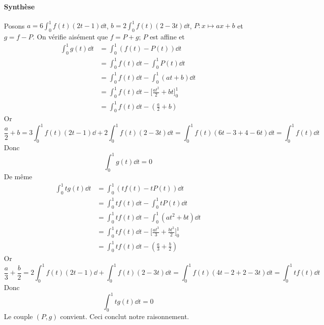 \documentclass[10pt]{article}
\begin{document}
    \paragraph{Synthèse} Posons $a=6\int_0^1f(t)(2t-1)\dd t$, $b=2\int_0^1f(t)(2-3t)\dd t$, $P:x\mapsto ax+b$ et $g=f-P$. On vérifie aisément que $f=P+g$; $P$ est affine et
    \begin{align*}
        \int_0^1g(t)\dd t &= \int_0^1(f(t)-P(t))\dd t\\
                          &= \int_0^1f(t)\dd t - \int_0^1P(t)\dd t\\
                          &= \int_0^1f(t)\dd t - \int_0^1(at+b)\dd t\\
                          &= \int_0^1f(t)\dd t - \Big[\frac {at^2}2+bt\Big]_0^1\\
                          &= \int_0^1f(t)\dd t - \left(\frac a2 +b\right)
    \end{align*}
    Or \[\frac a2 +b=3\int_0^1f(t)(2t-1)\dd+2\int_0^1f(t)(2-3t)\dd t=\int_0^1f(t)(6t-3+4-6t)\dd t=\int_0^1f(t)\dd t\]
    Donc \[\int_0^1g(t)\dd t=0\]
    De même 
    \begin{align*}
        \int_0^1tg(t)\dd t &= \int_0^1(tf(t)-tP(t))\dd t\\
                          &= \int_0^1tf(t)\dd t - \int_0^1tP(t)\dd t\\
                          &= \int_0^1tf(t)\dd t - \int_0^1(at^2+bt)\dd t\\
                          &= \int_0^1tf(t)\dd t - \Big[\frac {at^3}3+\frac{bt^2}2\Big]_0^1\\
                          &= \int_0^1tf(t)\dd t - \left(\frac a3 +\frac b2\right)
    \end{align*}
    Or \[\frac a3 +\frac b2=2\int_0^1f(t)(2t-1)\dd+\int_0^1f(t)(2-3t)\dd t=\int_0^1f(t)(4t-2+2-3t)\dd t=\int_0^1tf(t)\dd t\]
    Donc \[\int_0^1tg(t)\dd t=0\]
    Le couple $(P,g)$ convient. Ceci conclut notre raisonnement.
\end{document}
